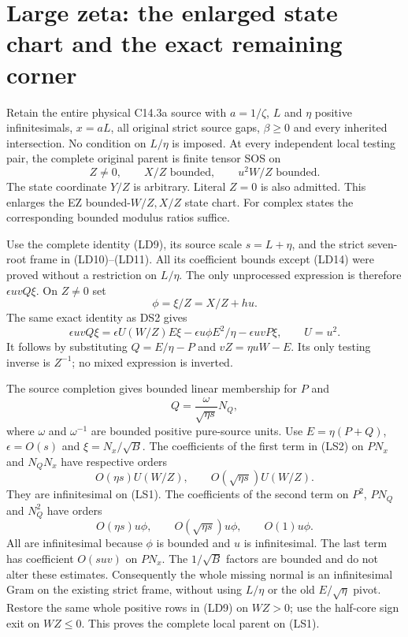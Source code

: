 \section{Large zeta: the enlarged state chart and the exact remaining corner}
\label{sec:r17-large-zeta-damped-state}

\begin{proposition}
Retain the entire physical C14.3a source with $a=1/\zeta$, $L$ and
$\eta$ positive infinitesimals, $x=aL$, all original strict source
gaps, $\beta\ge0$ and every inherited intersection. No condition
on $L/\eta$ is imposed. At every independent local testing pair,
the complete original parent is finite tensor SOS on
\[
 Z\ne0,\qquad X/Z\text{ bounded},\qquad
                         u^2W/Z\text{ bounded}.        \tag{LS1}
\]
The state coordinate $Y/Z$ is arbitrary. Literal $Z=0$ is also
admitted. This enlarges the EZ bounded-$W/Z,X/Z$ state chart.
For complex states the corresponding bounded modulus ratios suffice.
\end{proposition}

Use the complete identity (LD9), its source scale $s=L+\eta$,
and the strict seven-root frame in (LD10)--(LD11). All its coefficient
bounds except (LD14) were proved without a restriction on $L/\eta$.
The only unprocessed expression is therefore $\epsilon uvQ\xi$.
On $Z\ne0$ set
\[
 \phi=\xi/Z=X/Z+hu.
\]
The same exact identity as DS2 gives
\begin{equation}
 \epsilon uvQ\xi
  =\epsilon U(W/Z)E\xi
     -\epsilon u\phi E^2/\eta-\epsilon uvP\xi,
 \qquad U=u^2.                                      \tag{LS2}
\end{equation}
It follows by substituting $Q=E/\eta-P$ and $vZ=\eta uW-E$.
Its only testing inverse is $Z^{-1}$; no mixed expression is inverted.

The source completion gives bounded linear membership for $P$ and
\[
 Q=\frac{\omega}{\sqrt{\eta s}}N_Q,
\]
where $\omega$ and $\omega^{-1}$ are bounded positive pure-source
units. Use $E=\eta(P+Q)$, $\epsilon=O(s)$ and
$\xi=N_x/\sqrt B$. The coefficients of the first term in (LS2)
on $PN_x$ and $N_QN_x$ have respective orders
\[
 O(\eta s)U(W/Z),\qquad O(\sqrt{\eta s})U(W/Z).
\]
They are infinitesimal on (LS1). The coefficients of the second term
on $P^2$, $PN_Q$ and $N_Q^2$ have orders
\[
 O(\eta s)u\phi,\qquad
 O(\sqrt{\eta s})u\phi,\qquad O(1)u\phi.             \tag{LS3}
\]
All are infinitesimal because $\phi$ is bounded and $u$ is
infinitesimal. The last term has coefficient $O(suv)$ on $PN_x$.
The $1/\sqrt B$ factors are bounded and do not alter these estimates.
Consequently the whole missing normal is an infinitesimal Gram on
the existing strict frame, without using $L/\eta$ or the old
$E/\sqrt\eta$ pivot. Restore the same whole positive rows in (LD9)
on $WZ>0$; use the half-core sign exit on $WZ\le0$. This proves
the complete local parent on (LS1).

